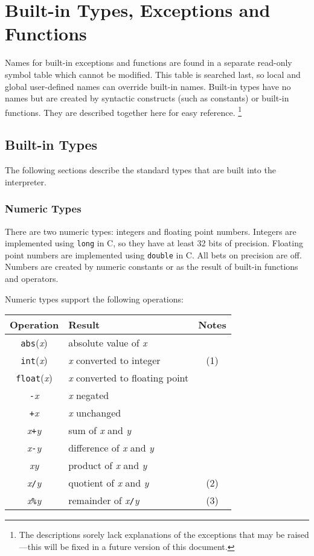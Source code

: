 \section{Built-in Types, Exceptions and Functions}

Names for built-in exceptions and functions are found in a separate
read-only symbol table which cannot be modified.
This table is searched last, so local and global user-defined names can
override built-in names.
Built-in types have no names but are created by syntactic constructs
(such as constants) or built-in functions.
They are described together here for easy reference.%
\footnote{
The descriptions sorely lack explanations of the exceptions that
may be raised---this will be fixed in a future version of this
document.
}

\subsection{Built-in Types}

The following sections describe the standard types that are built into the
interpreter.
\subsubsection{Numeric Types}

There are two numeric types: integers and floating point numbers.
Integers are implemented using {\tt long} in C, so they have at least 32
bits of precision.
Floating point numbers are implemented using {\tt double} in C.
All bets on precision are off.
Numbers are created by numeric constants or as the result of built-in
functions and operators.

Numeric types support the following operations:

\begin{center}
\begin{tabular}{|c|l|c|}
\hline
Operation & Result & Notes \\
\hline
{\tt abs}({\em x}) & absolute value of {\em x} & \\
{\tt int}({\em x}) & {\em x} converted to integer & (1) \\
{\tt float}({\em x}) & {\em x} converted to floating point & \\
{\tt -}{\em x} & {\em x} negated & \\
{\tt +}{\em x} & {\em x} unchanged & \\
{\em x}{\tt +}{\em y} & sum of {\em x} and {\em y} & \\
{\em x}{\tt -}{\em y} & difference of {\em x} and {\em y} & \\
{\em x}{\tt *}{\em y} & product of {\em x} and {\em y} & \\
{\em x}{\tt /}{\em y} & quotient of {\em x} and {\em y} & (2) \\
{\em x}{\tt \%}{\em y} & remainder of {\em x}{\tt /}{\em y} & (3) \\
\hline
\end{tabular}
\end{center}

